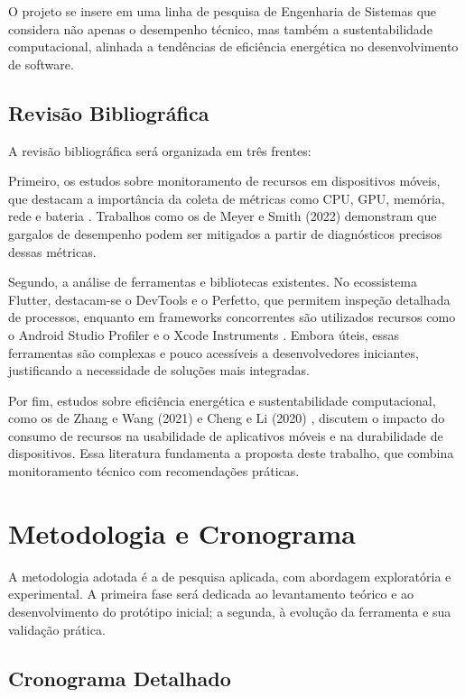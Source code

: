 \documentclass[12pt,a4paper]{article}
\begin{document}
O projeto se insere em uma linha de pesquisa de Engenharia de Sistemas que considera não apenas o desempenho técnico, mas também a sustentabilidade computacional, alinhada a tendências de eficiência energética no desenvolvimento de software.

\subsection{Revisão Bibliográfica}
A revisão bibliográfica será organizada em três frentes:  

Primeiro, os estudos sobre monitoramento de recursos em dispositivos móveis, que destacam a importância da coleta de métricas como CPU, GPU, memória, rede e bateria \cite{monitoring}. Trabalhos como os de Meyer e Smith (2022) \cite{performance} demonstram que gargalos de desempenho podem ser mitigados a partir de diagnósticos precisos dessas métricas.  

Segundo, a análise de ferramentas e bibliotecas existentes. No ecossistema Flutter, destacam-se o DevTools e o Perfetto, que permitem inspeção detalhada de processos, enquanto em frameworks concorrentes são utilizados recursos como o Android Studio Profiler e o Xcode Instruments \cite{flutter, dart}. Embora úteis, essas ferramentas são complexas e pouco acessíveis a desenvolvedores iniciantes, justificando a necessidade de soluções mais integradas.  

Por fim, estudos sobre eficiência energética e sustentabilidade computacional, como os de Zhang e Wang (2021) \cite{energy} e Cheng e Li (2020) \cite{mobile_energy}, discutem o impacto do consumo de recursos na usabilidade de aplicativos móveis e na durabilidade de dispositivos. Essa literatura fundamenta a proposta deste trabalho, que combina monitoramento técnico com recomendações práticas.

\section{Metodologia e Cronograma}

A metodologia adotada é a de pesquisa aplicada, com abordagem exploratória e experimental. A primeira fase será dedicada ao levantamento teórico e ao desenvolvimento do protótipo inicial; a segunda, à evolução da ferramenta e sua validação prática.  

\subsection*{Cronograma Detalhado}
\end{document}
